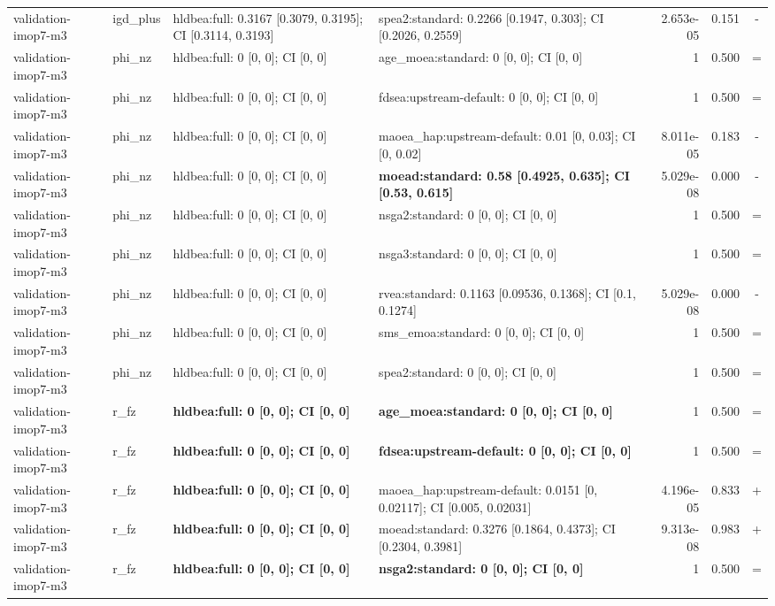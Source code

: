 \begin{tabular}{llllrrc}
validation-imop7-m3 & igd\_plus & hldbea:full: 0.3167 [0.3079, 0.3195]; CI [0.3114, 0.3193] & spea2:standard: 0.2266 [0.1947, 0.303]; CI [0.2026, 0.2559] & 2.653e-05 & 0.151 & - \\
validation-imop7-m3 & phi\_nz & hldbea:full: 0 [0, 0]; CI [0, 0] & age\_moea:standard: 0 [0, 0]; CI [0, 0] & 1 & 0.500 & = \\
validation-imop7-m3 & phi\_nz & hldbea:full: 0 [0, 0]; CI [0, 0] & fdsea:upstream-default: 0 [0, 0]; CI [0, 0] & 1 & 0.500 & = \\
validation-imop7-m3 & phi\_nz & hldbea:full: 0 [0, 0]; CI [0, 0] & maoea\_hap:upstream-default: 0.01 [0, 0.03]; CI [0, 0.02] & 8.011e-05 & 0.183 & - \\
validation-imop7-m3 & phi\_nz & hldbea:full: 0 [0, 0]; CI [0, 0] & \textbf{moead:standard: 0.58 [0.4925, 0.635]; CI [0.53, 0.615]} & 5.029e-08 & 0.000 & - \\
validation-imop7-m3 & phi\_nz & hldbea:full: 0 [0, 0]; CI [0, 0] & nsga2:standard: 0 [0, 0]; CI [0, 0] & 1 & 0.500 & = \\
validation-imop7-m3 & phi\_nz & hldbea:full: 0 [0, 0]; CI [0, 0] & nsga3:standard: 0 [0, 0]; CI [0, 0] & 1 & 0.500 & = \\
validation-imop7-m3 & phi\_nz & hldbea:full: 0 [0, 0]; CI [0, 0] & rvea:standard: 0.1163 [0.09536, 0.1368]; CI [0.1, 0.1274] & 5.029e-08 & 0.000 & - \\
validation-imop7-m3 & phi\_nz & hldbea:full: 0 [0, 0]; CI [0, 0] & sms\_emoa:standard: 0 [0, 0]; CI [0, 0] & 1 & 0.500 & = \\
validation-imop7-m3 & phi\_nz & hldbea:full: 0 [0, 0]; CI [0, 0] & spea2:standard: 0 [0, 0]; CI [0, 0] & 1 & 0.500 & = \\
validation-imop7-m3 & r\_fz & \textbf{hldbea:full: 0 [0, 0]; CI [0, 0]} & \textbf{age\_moea:standard: 0 [0, 0]; CI [0, 0]} & 1 & 0.500 & = \\
validation-imop7-m3 & r\_fz & \textbf{hldbea:full: 0 [0, 0]; CI [0, 0]} & \textbf{fdsea:upstream-default: 0 [0, 0]; CI [0, 0]} & 1 & 0.500 & = \\
validation-imop7-m3 & r\_fz & \textbf{hldbea:full: 0 [0, 0]; CI [0, 0]} & maoea\_hap:upstream-default: 0.0151 [0, 0.02117]; CI [0.005, 0.02031] & 4.196e-05 & 0.833 & + \\
validation-imop7-m3 & r\_fz & \textbf{hldbea:full: 0 [0, 0]; CI [0, 0]} & moead:standard: 0.3276 [0.1864, 0.4373]; CI [0.2304, 0.3981] & 9.313e-08 & 0.983 & + \\
validation-imop7-m3 & r\_fz & \textbf{hldbea:full: 0 [0, 0]; CI [0, 0]} & \textbf{nsga2:standard: 0 [0, 0]; CI [0, 0]} & 1 & 0.500 & = \\

\end{tabular}
